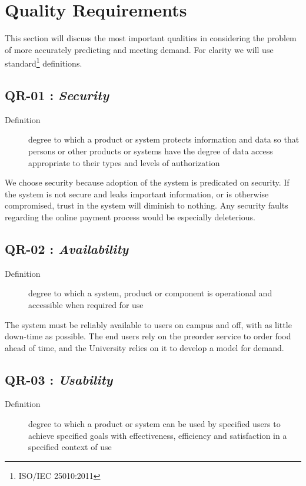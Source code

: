 \documentclass[11pt]{article}
\begin{document}
\section{Quality Requirements}
\label{sec:orga162350}

This section will discuss the most important qualities in
considering the problem of more accurately predicting and meeting
demand. For clarity we will use standard\footnote{ISO/IEC 25010:2011} definitions.

\subsection{\label{orgef473af}QR-01 : \emph{Security}}
\label{sec:org7866af2}
\begin{description}
\item[{Definition}] degree to which a product or system protects
information and data so that persons or other
products or systems have the degree of data access
appropriate to their types and levels of
authorization
\end{description}


We choose security because adoption of the system is predicated on
security. If the system is not secure and leaks important
information, or is otherwise compromised, trust in the system will
diminish to nothing. Any security faults regarding the online
payment process would be especially deleterious.
\subsection{\label{orgbf09470}QR-02 : \emph{Availability}}
\label{sec:org3d81978}
\begin{description}
\item[{Definition}] degree to which a system, product or component is
operational and accessible when required for use
\end{description}


The system must be reliably available to users on campus and off,
with as little down-time as possible. The end users rely on the
preorder service to order food ahead of time, and the University
relies on it to develop a model for demand.

\subsection{\label{org3096e4c}QR-03 : \emph{Usability}}
\label{sec:org6d75803}
\begin{description}
\item[{Definition}] degree to which a product or system can be used by
specified users to achieve specified goals with
effectiveness, efficiency and satisfaction in a
specified context of use
\end{description}
\end{document}
